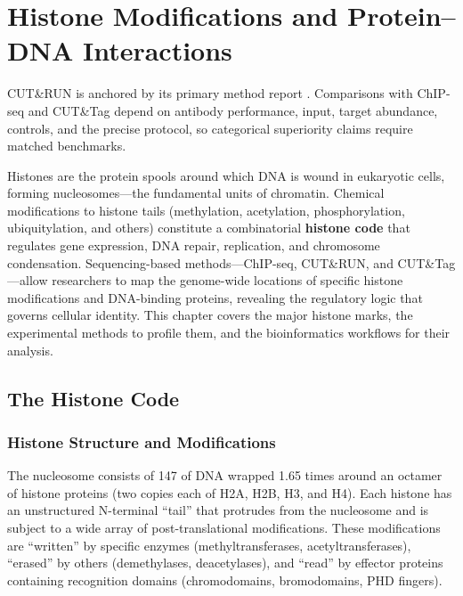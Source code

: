 \chapter{Histone Modifications and Protein--DNA Interactions}
\label{ch:histones}

\begin{sourcebox}
CUT\&RUN is anchored by its primary method report \cite{skene2017}. Comparisons with ChIP-seq and CUT\&Tag depend on antibody performance, input, target abundance, controls, and the precise protocol, so categorical superiority claims require matched benchmarks.
\end{sourcebox}

\begin{keyconcept}
Histones are the protein spools around which DNA is wound in eukaryotic cells, forming nucleosomes---the fundamental units of chromatin. Chemical modifications to histone tails (methylation, acetylation, phosphorylation, ubiquitylation, and others) constitute a combinatorial \textbf{histone code} that regulates gene expression, DNA repair, replication, and chromosome condensation. Sequencing-based methods---ChIP-seq, CUT\&RUN, and CUT\&Tag---allow researchers to map the genome-wide locations of specific histone modifications and DNA-binding proteins, revealing the regulatory logic that governs cellular identity. This chapter covers the major histone marks, the experimental methods to profile them, and the bioinformatics workflows for their analysis.
\end{keyconcept}

\section{The Histone Code}
\label{sec:histones:code}

\subsection{Histone Structure and Modifications}
\label{subsec:histones:structure}

The nucleosome consists of 147\basepair{} of DNA wrapped 1.65 times around an octamer of histone proteins (two copies each of H2A, H2B, H3, and H4). Each histone has an unstructured N-terminal ``tail'' that protrudes from the nucleosome and is subject to a wide array of post-translational modifications. These modifications are ``written'' by specific enzymes (methyltransferases, acetyltransferases), ``erased'' by others (demethylases, deacetylases), and ``read'' by effector proteins containing recognition domains (chromodomains, bromodomains, PHD fingers).

